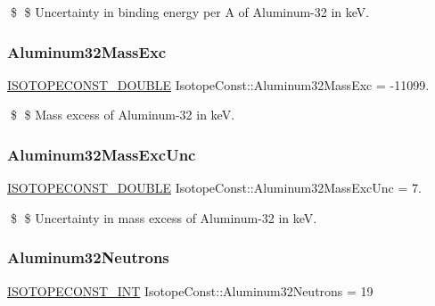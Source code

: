 \$ \$ Uncertainty in binding energy per A of Aluminum-\/32 in keV. \mbox{\label{group___isotope_const-_aluminum-_al32_ga8f6986aaca3d2a696f6cb96f6d7a8e4d}} 
\subsubsection{\texorpdfstring{Aluminum32\+Mass\+Exc}{Aluminum32MassExc}}
{\footnotesize\ttfamily \mbox{\hyperlink{group___isotope_const-_macros_ga8f45a7272ce02c0b4c65c44636ed719a}{I\+S\+O\+T\+O\+P\+E\+C\+O\+N\+S\+T\+\_\+\+D\+O\+U\+B\+LE}} Isotope\+Const\+::\+Aluminum32\+Mass\+Exc = -\/11099.}

\$ \$ Mass excess of Aluminum-\/32 in keV. \mbox{\label{group___isotope_const-_aluminum-_al32_ga56d2c06f67d001466dce108e464fa7dc}} 
\subsubsection{\texorpdfstring{Aluminum32\+Mass\+Exc\+Unc}{Aluminum32MassExcUnc}}
{\footnotesize\ttfamily \mbox{\hyperlink{group___isotope_const-_macros_ga8f45a7272ce02c0b4c65c44636ed719a}{I\+S\+O\+T\+O\+P\+E\+C\+O\+N\+S\+T\+\_\+\+D\+O\+U\+B\+LE}} Isotope\+Const\+::\+Aluminum32\+Mass\+Exc\+Unc = 7.}

\$ \$ Uncertainty in mass excess of Aluminum-\/32 in keV. \mbox{\label{group___isotope_const-_aluminum-_al32_gaa71b23bd915ea768633de294d693b938}} 
\subsubsection{\texorpdfstring{Aluminum32\+Neutrons}{Aluminum32Neutrons}}
{\footnotesize\ttfamily \mbox{\hyperlink{group___isotope_const-_macros_ga5f18360b3e99483a35c32d789e62621c}{I\+S\+O\+T\+O\+P\+E\+C\+O\+N\+S\+T\+\_\+\+I\+NT}} Isotope\+Const\+::\+Aluminum32\+Neutrons = 19}

